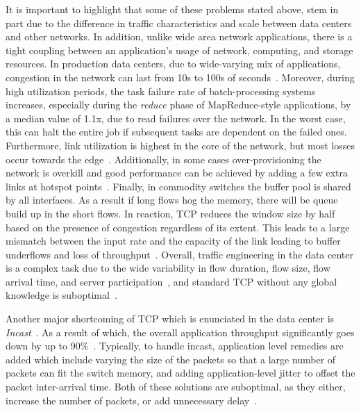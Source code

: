 \documentclass[a4paper,12pt,twoside,openright]{report}
\begin{document}
It is important to highlight that some of these problems stated above, stem in
part due to the difference in traffic characteristics and scale between data
centers and other networks. In addition, unlike wide area network applications,
there is a tight coupling between an application's usage of network, computing,
and storage resources. In production data centers, due to wide-varying mix of
applications, congestion in the network can last from 10s to 100s of
seconds~\cite{Kandula:2009:NDC}. Moreover, during high utilization periods, the
task failure rate of batch-processing systems increases, especially during the
\emph{reduce} phase of MapReduce-style applications, by a median value of 1.1x,
due to read failures over the network. In the worst case, this can halt the
entire job if subsequent tasks are dependent on the failed ones. Furthermore,
link utilization is highest in the core of the network, but most losses occur
towards the edge~\cite{Benson:2010:NTC}. Additionally, in some cases
over-provisioning the network is overkill and good performance can be achieved
by adding a few extra links at hotspot points~\cite{Kandula:2009:FTD}. Finally,
in commodity switches the buffer pool is shared by all interfaces. As a result
if long flows hog the memory, there will be queue build up in the short flows.
In reaction, TCP reduces the window size by half based on the presence of
congestion regardless of its extent. This leads to a large mismatch between the
input rate and the capacity of the link leading to buffer underflows and loss of
throughput~\cite{Alizadeh:2010:DCT}. Overall, traffic engineering in the data
center is a complex task due to the wide variability in flow duration, flow
size, flow arrival time, and server participation~\cite{Kandula:2009:NDC}, and
standard TCP without any global knowledge is suboptimal~\cite{Benson:2010:CFT}.

Another major shortcoming of TCP which is enunciated in the data center is
\emph{Incast}~\cite{Chen:2009:UTI,Vasudevan:2009:SEF,Wu:2010:IIC,Alizadeh:2010:DCT}.
As a result of which, the overall application throughput significantly goes down
by up to 90\%~\cite{Vasudevan:2009:SEF}. Typically, to handle incast,
application level remedies are added which include varying the size of the
packets so that a large number of packets can fit the switch memory, and adding
application-level jitter to offset the packet inter-arrival time. Both of these
solutions are suboptimal, as they either, increase the number of packets, or add
unnecessary delay~\cite{Alizadeh:2010:DCT}.
\end{document}
